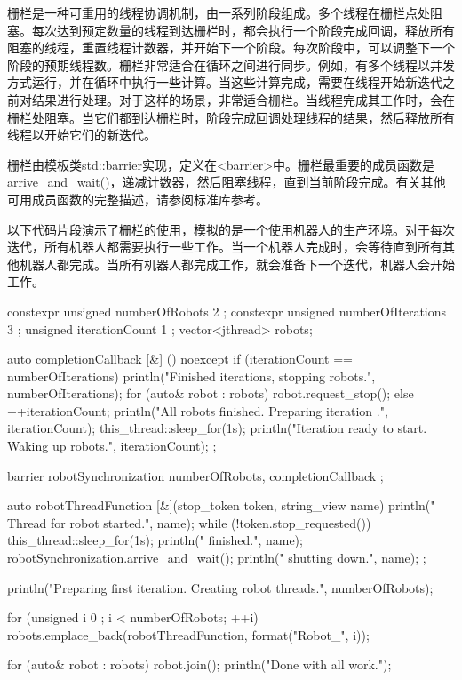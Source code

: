 栅栏是一种可重用的线程协调机制，由一系列阶段组成。多个线程在栅栏点处阻塞。每次达到预定数量的线程到达栅栏时，都会执行一个阶段完成回调，释放所有阻塞的线程，重置线程计数器，并开始下一个阶段。每次阶段中，可以调整下一个阶段的预期线程数。栅栏非常适合在循环之间进行同步。例如，有多个线程以并发方式运行，并在循环中执行一些计算。当这些计算完成，需要在线程开始新迭代之前对结果进行处理。对于这样的场景，非常适合栅栏。当线程完成其工作时，会在栅栏处阻塞。当它们都到达栅栏时，阶段完成回调处理线程的结果，然后释放所有线程以开始它们的新迭代。

栅栏由模板类std::barrier实现，定义在<barrier>中。栅栏最重要的成员函数是arrive\_and\_wait()，递减计数器，然后阻塞线程，直到当前阶段完成。有关其他可用成员函数的完整描述，请参阅标准库参考。

以下代码片段演示了栅栏的使用，模拟的是一个使用机器人的生产环境。对于每次迭代，所有机器人都需要执行一些工作。当一个机器人完成时，会等待直到所有其他机器人都完成。当所有机器人都完成工作，就会准备下一个迭代，机器人会开始工作。

\begin{cpp}
constexpr unsigned numberOfRobots { 2 };
constexpr unsigned numberOfIterations { 3 };
unsigned iterationCount { 1 };
vector<jthread> robots;

auto completionCallback { [&] () noexcept {
    if (iterationCount == numberOfIterations) {
        println("Finished {} iterations, stopping robots.", numberOfIterations);
        for (auto& robot : robots) { robot.request_stop(); }
    } else {
        ++iterationCount;
        println("All robots finished. Preparing iteration {}.", iterationCount);
        this_thread::sleep_for(1s);
        println("Iteration {} ready to start. Waking up robots.", iterationCount);
    }
} };

barrier robotSynchronization { numberOfRobots, completionCallback };

auto robotThreadFunction { [&](stop_token token, string_view name) {
        println(" Thread for robot {} started.", name);
        while (!token.stop_requested()) {
            this_thread::sleep_for(1s);
            println(" {} finished.", name);
            robotSynchronization.arrive_and_wait();
        }
        println(" {} shutting down.", name);
} };

println("Preparing first iteration. Creating {} robot threads.", numberOfRobots);

for (unsigned i { 0 }; i < numberOfRobots; ++i) {
    robots.emplace_back(robotThreadFunction, format("Robot_{}", i));
}

for (auto& robot : robots) { robot.join(); }
println("Done with all work.");
\end{cpp}

